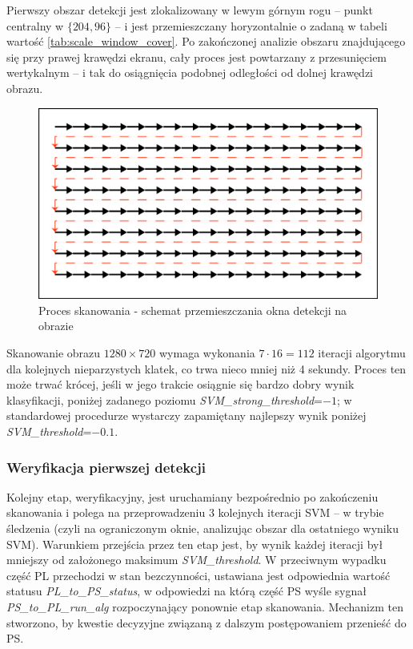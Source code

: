 Pierwszy obszar detekcji jest zlokalizowany w lewym górnym rogu -- punkt centralny w $\{204,96\}$ -- i jest przemieszczany horyzontalnie o zadaną w tabeli wartość \ref{tab:scale_window_cover}. %
Po zakończonej analizie obszaru znajdującego się przy prawej krawędzi ekranu, cały proces jest powtarzany z przesunięciem wertykalnym -- i tak do osiągnięcia podobnej odległości od dolnej krawędzi obrazu. %
\begin{figure}[h]
	\centering
	\includegraphics[width=12cm]{6_scanning.jpg}
	\caption{Proces skanowania - schemat przemieszczania okna detekcji na obrazie}
	\label{fig:scan_scheme}
\end{figure}
Skanowanie obrazu $1280\times 720$ wymaga wykonania $7\cdot16=112$ iteracji algorytmu dla kolejnych nieparzystych klatek, co trwa nieco mniej niż 4 sekundy. %
Proces ten może trwać krócej, jeśli w jego trakcie osiągnie się bardzo dobry wynik klasyfikacji, poniżej zadanego poziomu \textit{SVM\_strong\_threshold}=$-1$; w standardowej procedurze wystarczy zapamiętany najlepszy wynik poniżej \textit{SVM\_threshold}=$-0.1$. %

\subsubsection{Weryfikacja pierwszej detekcji}
Kolejny etap, weryfikacyjny, jest uruchamiany bezpośrednio po zakończeniu skanowania i polega na przeprowadzeniu 3 kolejnych iteracji SVM -- w trybie śledzenia (czyli na ograniczonym oknie, analizując obszar dla ostatniego wyniku SVM). %
Warunkiem przejścia przez ten etap jest, by wynik każdej iteracji był mniejszy od założonego maksimum \textit{SVM\_threshold}. 
W przeciwnym wypadku część PL przechodzi w stan bezczynności, ustawiana jest odpowiednia wartość statusu \textit{PL\_to\_PS\_status}, w odpowiedzi na którą część PS wyśle sygnał \textit{PS\_to\_PL\_run\_alg} rozpoczynający ponownie etap skanowania. Mechanizm ten stworzono, by kwestie decyzyjne związaną z dalszym postępowaniem przenieść do PS.

